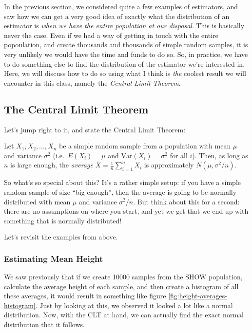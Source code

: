 \documentclass[]{book}
\theoremstyle{definition}
\theoremstyle{definition}
\theoremstyle{definition}
\theoremstyle{remark}
\let\BeginKnitrBlock\begin \let\EndKnitrBlock\end
\begin{document}
In the previous section, we considered quite a few examples of estimators, and saw how we can get a very good idea of exactly what the distribution of an estimator is \emph{when we have the entire population at our disposal}. This is basically never the case. Even if we had a way of getting in touch with the entire popoulation, and create thousands and thousands of simple random samples, it is very unlikely we would have the time and funds to do so. So, in practice, we have to do something else to find the distribution of the estimator we're interested in. Here, we will discuss how to do so using what I think is \emph{the} coolest result we will encounter in this class, namely the \emph{Central Limit Theorem}.

\hypertarget{CLT}{%
\subsection{The Central Limit Theorem}\label{CLT}}

Let's jump right to it, and state the Central Limit Theorem:

\BeginKnitrBlock{theorem}[The Central Limit Theorem]
\protect\hypertarget{thm:theCLT}{}{\label{thm:theCLT} {} }Let \(X_1, X_2, ..., X_n\) be a simple random sample from a population with mean \(\mu\) and variance \(\sigma^2\) (i.e.~\(E(X_i) = \mu\) and \(\text{Var}(X_i) = \sigma^2\) for all \(i\)). Then, as long as \(n\) is large enough, the \emph{average} \(\bar{X} = \frac{1}{n} \sum_{i=1}^n X_i\) is approximately \(N(\mu, \sigma^2 / n)\).
\EndKnitrBlock{theorem}

So what's so special about this? It's a rather simple setup: if you have a simple random sample of size ``big enough'', then the average is going to be normally distributed with mean \(\mu\) and variance \(\sigma^2/n\). But think about this for a second: there are no assumptions on where you start, and yet we get that we end up with something that is normally distributed!

Let's revisit the examples from above.

\hypertarget{estimating-mean-height-1}{%
\subsubsection*{Estimating Mean Height}\label{estimating-mean-height-1}}

We saw previously that if we create 10000 samples from the SHOW population, calculate the average height of each sample, and then create a histogram of all these averages, it would result in something like figure \ref{fig:height-averages-histogram}. Just by looking at this, we observed it looked a lot like a normal distribution. Now, with the CLT at hand, we can actually find the exact normal distribution that it follows.
\end{document}
